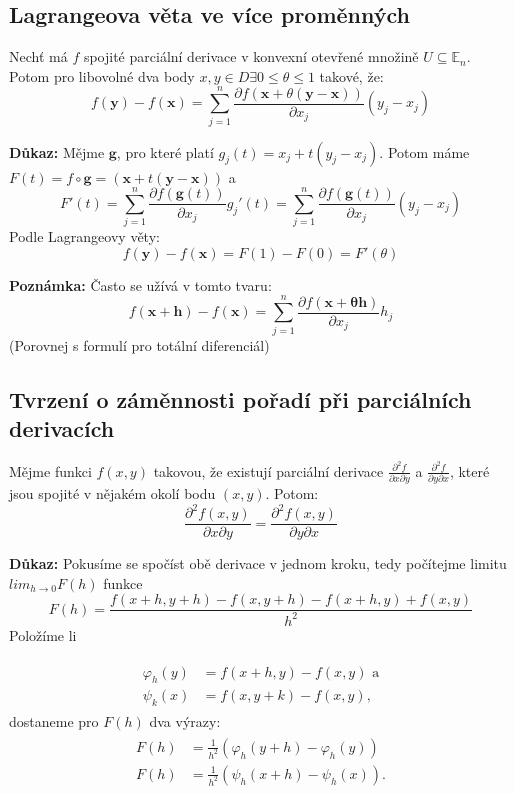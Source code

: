 \documentclass[10pt]{article}
\begin{document}
\subsection{Lagrangeova věta ve více proměnných}
\hspace{1.2mm}
\noindent
Nechť má $f$ spojité parciální derivace v konvexní otevřené množině $U \subseteq \mathbb{E}_{n}$.
Potom pro libovolné dva body $x,y \in D \exists 0 \leq \theta \leq 1$ takové, že:
\[ f(\mathbf{y}) - f(\mathbf{x}) =
\sum^{n}_{j=1} \frac{\partial f(\mathbf{x} + \theta (\mathbf{y}-\mathbf{x}))}{\partial x_j}(y_j - x_j) \]

\noindent
\textbf{Důkaz:}
Mějme $\mathbf{g}$, pro které platí $g_j(t) = x_j + t(y_j - x_j)$.
Potom máme $F(t) = f \circ \mathbf{g} = (\mathbf{x} + t(\mathbf{y}-\mathbf{x}))$ a
\[ F'(t) = \sum^{n}_{j=1} \frac{\partial f(\mathbf{g}(t))}{\partial x_j}g_j'(t) =
\sum^{n}_{j=1} \frac{\partial f(\mathbf{g}(t))}{\partial x_j}(y_j - x_j)  \]
Podle Lagrangeovy věty:
\[ f(\mathbf{y}) - f(\mathbf{x}) = F(1) - F(0) = F'(\theta) \]

\noindent
\textbf{Poznámka:}
Často se užívá v tomto tvaru:
\[ f(\mathbf{x} + \mathbf{h}) - f(\mathbf{x}) =
\sum^{n}_{j=1} \frac{\partial f(\mathbf{x + \theta \mathbf{h}})}{\partial x_j}h_j \]
(Porovnej s formulí pro totální diferenciál)

\subsection{Tvrzení o záměnnosti pořadí při parciálních derivacích}
\hspace{1.2mm}
\noindent
Mějme funkci $f(x,y)$ takovou, že existují parciální derivace
$\frac{\partial ^2 f}{\partial x \partial y}$ a $\frac{\partial ^2 f}{\partial y \partial x}$, které
jsou spojité v nějakém okolí bodu $(x,y)$. Potom:
\[ \frac{\partial ^2 f(x,y)}{\partial x \partial y} = \frac{\partial ^2 f(x,y)}{\partial y \partial x} \]

\noindent
\textbf{Důkaz:} Pokusíme se spočíst obě derivace v jednom kroku, tedy počítejme limitu $lim_{h\rightarrow 0} F(h)$ funkce
\[F(h) = \frac{f(x+h,y+h) - f(x,y+h) - f(x+h,y) + f(x,y)}{h^2}\]
Položíme li 

\begin{align*} 
\begin{split}
\varphi_h(y) & = f(x+h,y) - f(x,y)\text{ a}\\
\psi_k(x) & = f(x,y+k) - f(x,y),
\end{split}
\end{align*}
dostaneme pro $F(h)$ dva výrazy:
\begin{align*} 
\begin{split}
F(h) & = \frac{1}{h^2} (\varphi_h(y+h) - \varphi_h(y))\\
F(h) & = \frac{1}{h^2} (\psi_h(x+h)-\psi_h(x)).
\end{split}
\end{align*}
\end{document}
